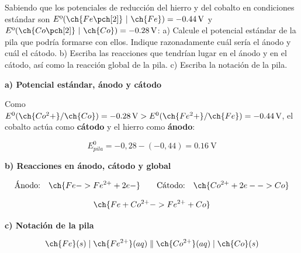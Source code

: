 \begin{exerciseEVAU}
    Sabiendo que los potenciales de reducción del hierro y del cobalto en condiciones estándar son \( E\text{º}(\ch{Fe\pch[2]}\ | \ \ch{Fe}) = \SI{-0.44}{\volt} \)  y \( E\text{º}(\ch{Co\pch[2]}\ | \ \ch{Co}) = \SI{-0.28}{\volt} \): a) Calcule el potencial estándar de la pila que podría formarse con ellos. Indique razonadamente cuál sería el ánodo y cuál el cátodo. b) Escriba las reacciones que tendrían lugar en el ánodo y en el cátodo, así como la reacción global de la pila. c) Escriba la notación de la pila.

    \begin{solu}


        \textbf{a) Potencial estándar, ánodo y cátodo}

        Como \(E^0(\ch{Co^2+}/\ch{Co}) = \SI{-0.28}{\volt} > E^0(\ch{Fe^2+}/\ch{Fe}) = \SI{-0.44}{\volt}\), el cobalto actúa como \textbf{cátodo} y el hierro como \textbf{ánodo}:

        \begin{equation*}
            E^0_{pila} = -0,28-(-0,44) = \SI{0.16}{\volt}
        \end{equation*}

        \textbf{b) Reacciones en ánodo, cátodo y global}

        \begin{equation*}
            \text{Ánodo:} \quad \ch{Fe -> Fe^{2+} + 2 e-} \qquad \text{Cátodo:} \quad \ch{Co^{2+} + 2 e- -> Co}
        \end{equation*}

        \begin{equation*}
            \ch{Fe + Co^{2+} -> Fe^{2+} + Co}
        \end{equation*}

        \textbf{c) Notación de la pila}

        \begin{equation*}
            \ch{Fe}(s) \mid \ch{Fe^{2+}}(aq) \parallel \ch{Co^{2+}}(aq) \mid \ch{Co}(s)
        \end{equation*}

    \end{solu}
\end{exerciseEVAU}

